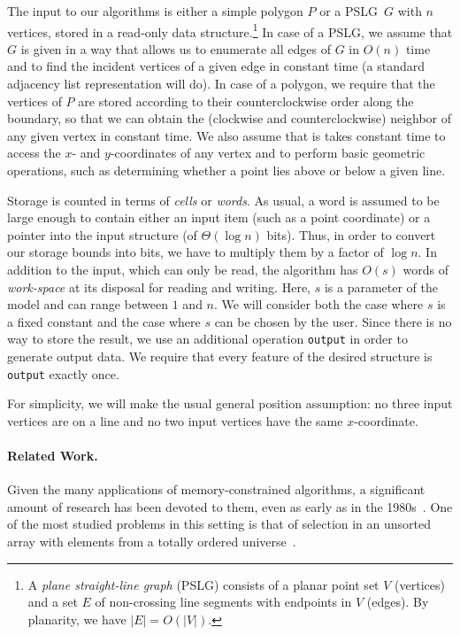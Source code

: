 \documentclass[11pt,a4paper]{article}
\newcommand{\pslg}{PSLG}
\begin{document}
The input to our algorithms is either a simple polygon $P$ or a \pslg\
$G$
with $n$ vertices, stored in a read-only data structure.\footnote{A
\emph{plane straight-line graph} (PSLG) consists of a planar point set $V$
(vertices) and a set $E$ of non-crossing line segments
 with endpoints in $V$ (edges). By planarity, we have $|E| = O(|V|)$.}
In case of a \pslg, we assume that $G$ is given in a way
that allows us to enumerate all edges of $G$ in $O(n)$ time and to find the
incident vertices of a given edge in constant time (a standard adjacency
list representation will do).
In case of a polygon, we require that the vertices of $P$ are stored according
to their counterclockwise order along the boundary, so
that we can obtain the (clockwise and counterclockwise) neighbor
of any given vertex in constant time.
We also assume that is takes constant time to access the $x$-
and $y$-coordinates of any  vertex
and to perform basic geometric operations, such as determining
whether a point lies above or below a given line.

Storage is counted in terms of \emph{cells} or \emph{words}.
As usual, a word is assumed to be large enough to contain either
an input item (such as a point coordinate)
or a pointer into the input structure (of $\Theta(\log n)$ bits).
Thus, in order to convert our storage bounds into
bits, we have to multiply them by a factor of $\log n$.
In addition to the input, which can only be read, the algorithm has
$O(s)$ words of \emph{work-space} at its disposal for reading and writing.
Here, $s$ is a parameter of the model and can range between $1$ and $n$.
We will consider both the case where $s$ is a fixed constant
and the case where $s$ can be chosen by the user. Since there is no way
to store the result, we use an additional operation \texttt{output} in order
to generate output data. We require that every feature
of the desired structure is \texttt{output} exactly once.

For simplicity, we will make the usual general position assumption:
no three input vertices are on a line and no two input vertices have
the same $x$-coordinate.


\paragraph{Related Work.}
Given the many applications of memory-constrained algorithms, a
significant amount of research has been devoted to them,
even as early as in the 1980s~\cite{MunroPa80}.
One of the most studied problems in this setting is that of
selection in an unsorted array with elements from a totally ordered
universe~\cite{MunroRa96,MunroPa80,Frederickson87,RamanRa98,Chan10}.
\end{document}
